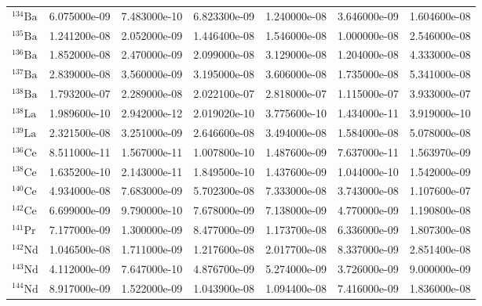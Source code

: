\begin{tabular}{lrrrrrr}
$^{134}\mathrm{Ba}$ &       6.075000e-09 &      7.483000e-10 &      6.823300e-09 &       1.240000e-08 &      3.646000e-09 &      1.604600e-08 \\
$^{135}\mathrm{Ba}$ &       1.241200e-08 &      2.052000e-09 &      1.446400e-08 &       1.546000e-08 &      1.000000e-08 &      2.546000e-08 \\
$^{136}\mathrm{Ba}$ &       1.852000e-08 &      2.470000e-09 &      2.099000e-08 &       3.129000e-08 &      1.204000e-08 &      4.333000e-08 \\
$^{137}\mathrm{Ba}$ &       2.839000e-08 &      3.560000e-09 &      3.195000e-08 &       3.606000e-08 &      1.735000e-08 &      5.341000e-08 \\
$^{138}\mathrm{Ba}$ &       1.793200e-07 &      2.289000e-08 &      2.022100e-07 &       2.818000e-07 &      1.115000e-07 &      3.933000e-07 \\
$^{138}\mathrm{La}$ &       1.989600e-10 &      2.942000e-12 &      2.019020e-10 &       3.775600e-10 &      1.434000e-11 &      3.919000e-10 \\
$^{139}\mathrm{La}$ &       2.321500e-08 &      3.251000e-09 &      2.646600e-08 &       3.494000e-08 &      1.584000e-08 &      5.078000e-08 \\
$^{136}\mathrm{Ce}$ &       8.511000e-11 &      1.567000e-11 &      1.007800e-10 &       1.487600e-09 &      7.637000e-11 &      1.563970e-09 \\
$^{138}\mathrm{Ce}$ &       1.635200e-10 &      2.143000e-11 &      1.849500e-10 &       1.437600e-09 &      1.044000e-10 &      1.542000e-09 \\
$^{140}\mathrm{Ce}$ &       4.934000e-08 &      7.683000e-09 &      5.702300e-08 &       7.333000e-08 &      3.743000e-08 &      1.107600e-07 \\
$^{142}\mathrm{Ce}$ &       6.699000e-09 &      9.790000e-10 &      7.678000e-09 &       7.138000e-09 &      4.770000e-09 &      1.190800e-08 \\
$^{141}\mathrm{Pr}$ &       7.177000e-09 &      1.300000e-09 &      8.477000e-09 &       1.173700e-08 &      6.336000e-09 &      1.807300e-08 \\
$^{142}\mathrm{Nd}$ &       1.046500e-08 &      1.711000e-09 &      1.217600e-08 &       2.017700e-08 &      8.337000e-09 &      2.851400e-08 \\
$^{143}\mathrm{Nd}$ &       4.112000e-09 &      7.647000e-10 &      4.876700e-09 &       5.274000e-09 &      3.726000e-09 &      9.000000e-09 \\
$^{144}\mathrm{Nd}$ &       8.917000e-09 &      1.522000e-09 &      1.043900e-08 &       1.094400e-08 &      7.416000e-09 &      1.836000e-08 \\

\end{tabular}
